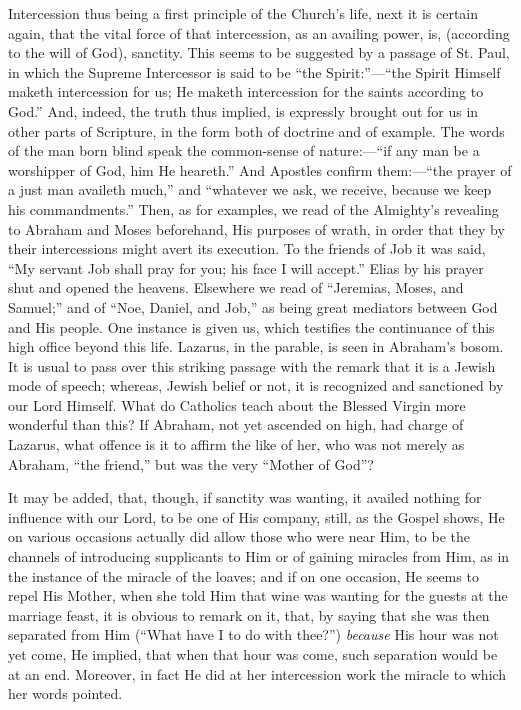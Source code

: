 Intercession thus being a first principle of the Church's life, next
it is certain again, that the vital force of that intercession, as an
availing power, is, (according to the will of God), sanctity. This seems
to be suggested by a passage of St. Paul, in which the Supreme
Intercessor is said to be ``the Spirit:''—``the Spirit
Himself maketh intercession for us; He maketh intercession for the
saints according to God.'' And, indeed, the truth thus implied, is
expressly brought out for us in other parts of Scripture, in the form
both of doctrine and of example. The words of the man born blind speak
the common-sense of nature:—``if any man be a worshipper of God,
him He heareth.'' And Apostles confirm them:—``the prayer of a
just man availeth much,'' and ``whatever we ask, we receive,
because we keep his commandments.'' Then, as for examples, we
read of the Almighty's revealing to Abraham and Moses beforehand, His
purposes of wrath, in order that they by their intercessions might avert
its execution. To the friends of Job it was said, ``My servant Job
shall pray for you; his face I will accept.'' Elias by his prayer
shut and opened the heavens. Elsewhere we read of ``Jeremias, Moses,
and Samuel;'' and of ``Noe, Daniel, and Job,'' as being
great mediators between God and His people. One instance is given us,
which testifies the continuance of this high office beyond this life.
Lazarus, in the parable, is seen in Abraham's bosom. It is usual to pass
over this striking passage with the remark that it is a Jewish mode of
speech; whereas, Jewish belief or not, it is recognized and sanctioned
by our Lord Himself. What do Catholics teach about the Blessed Virgin
more wonderful than this? If Abraham, not yet ascended on high, had
charge of Lazarus, what offence is it to affirm the like of her, who was
not merely as Abraham, ``the friend,'' but was the very
``Mother of God''?

It may be added, that, though, if sanctity was wanting, it availed
nothing for influence with our Lord, to be one of His company, still, as
the Gospel shows, He on various occasions actually did allow those who
were near Him, to be the channels of introducing supplicants to Him or
of gaining miracles from Him, as in the instance of the miracle of the
loaves; and if on one occasion, He seems to repel His Mother, when she
told Him that wine was wanting for the guests at the marriage feast, it
is obvious to remark on it, that, by saying that she was then separated
from Him (``What have I to do with thee?'') \emph{because}
His hour was not yet come, He implied, that when that hour was come,
such separation would be at an end. Moreover, in fact He did at her
intercession work the miracle to which her words pointed.

